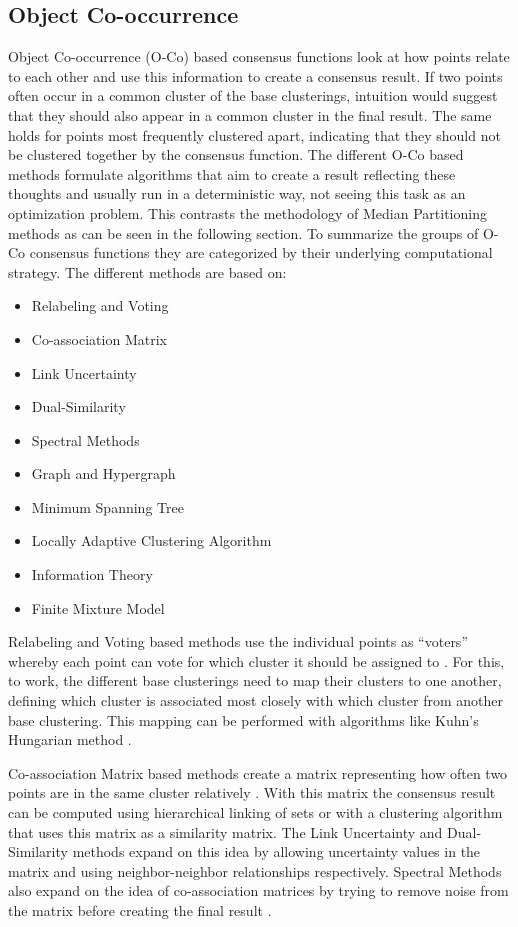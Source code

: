\documentclass[
	a4paper,
	english,
	twoside,
	openright,               
	11pt                            
	]{report}
\begin{document}
\subsection{Object Co-occurrence}
Object Co-occurrence (O-Co) based consensus functions look at how points relate to each other and use this information to create a consensus result. If two points often occur in a common cluster of the base clusterings, intuition would suggest that they should also appear in a common cluster in the final result. The same holds for points most frequently clustered apart, indicating that they should not be clustered together by the consensus function. The different O-Co based methods formulate algorithms that aim to create a result reflecting these thoughts and usually run in a deterministic way, not seeing this task as an optimization problem. This contrasts the methodology of Median Partitioning methods as can be seen in the following section. To summarize the groups of O-Co consensus functions they are categorized by their underlying computational strategy. The different methods are based on:

\begin{itemize}
  \item Relabeling and Voting
  \item Co-association Matrix
  \item Link Uncertainty
  \item Dual-Similarity
  \item Spectral Methods
  \item Graph and Hypergraph
  \item Minimum Spanning Tree
  \item Locally Adaptive Clustering Algorithm
  \item Information Theory
  \item Finite Mixture Model
\end{itemize}

Relabeling and Voting based methods use the individual points as  ``voters'' whereby each point can vote for which cluster it should be assigned to \cite{4470298}. For this, to work, the different base clusterings need to map their clusters to one another, defining which cluster is associated most closely with which cluster from another base clustering. This mapping can be performed with algorithms like Kuhn’s Hungarian method \cite{Kuhn2010}.

Co-association Matrix based methods create a matrix representing how often two points are in the same cluster relatively  \cite{Monti2003}. With this matrix the consensus result can be computed using hierarchical linking of sets or with a clustering algorithm that uses this matrix as a similarity matrix. The Link Uncertainty \cite{6413733} and Dual-Similarity \cite{7344797} methods expand on this idea by allowing uncertainty values in the matrix and using neighbor-neighbor relationships respectively. Spectral Methods also expand on the idea of co-association matrices by trying to remove noise from the matrix before creating the final result \cite{Tao:2016:RSE:2983323.2983745}.
\end{document}
